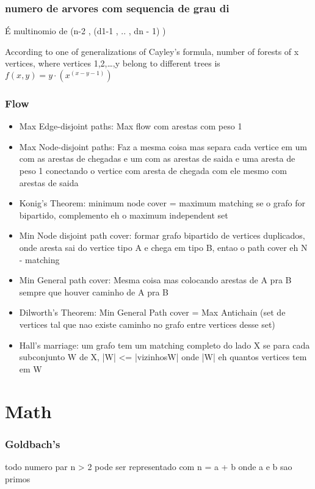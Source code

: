\documentclass{article}
\begin{document}
\subsection{numero de arvores com sequencia de grau di} É
multinomio de (n-2 , (d1-1  , .. , dn - 1) ) 

According to one of generalizations of Cayley's formula, number of forests of x vertices, where vertices 1,2,…,y belong to different trees is $f(x,y) = y\cdot (x^(x-y-1))$


\subsection{Flow}
\begin{itemize}
    \item Max Edge-disjoint paths: Max flow com arestas com peso 1
    \item Max Node-disjoint paths: Faz a mesma coisa mas separa cada vertice em um com as arestas de chegadas e um com as arestas de saida e uma aresta de peso 1 conectando o vertice com aresta de chegada com ele mesmo com arestas de saida
    \item Konig's Theorem: minimum node cover = maximum matching se o grafo for bipartido, complemento eh o maximum independent set
    \item Min Node disjoint path cover: formar grafo bipartido de vertices duplicados, onde aresta sai do vertice tipo A e chega em tipo B, entao o path cover eh N - matching
    \item Min General path cover: Mesma coisa mas colocando arestas de A pra B sempre que houver caminho de A pra B
    \item Dilworth's Theorem: Min General Path cover = Max Antichain (set de vertices tal que nao existe caminho no grafo entre vertices desse set)
    \item Hall's marriage: um grafo tem um matching completo do lado X se para cada subconjunto W de X, |W| <= |vizinhosW| onde |W| eh quantos vertices tem em W


\end{itemize}


\chapter{Math}

\subsection{Goldbach's} todo numero par n > 2 pode ser representado com n = a + b onde a e b sao primos
\end{document}

